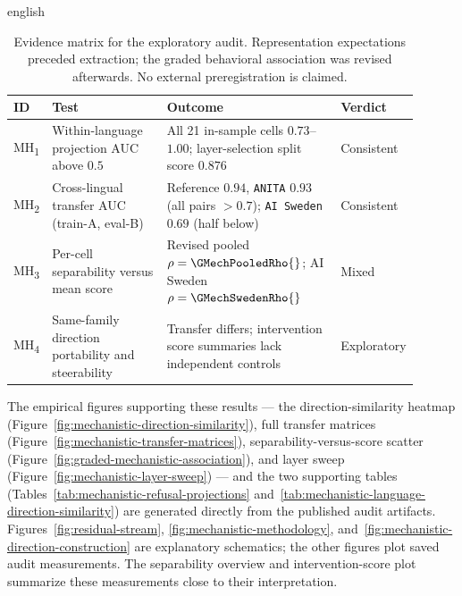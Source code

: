 \begin{otherlanguage*}{english}
\begin{table}[htbp]
\centering
\scriptsize
\caption[Evidence matrix for the refusal-direction audit]{Evidence matrix for the exploratory audit. Representation expectations preceded extraction; the graded behavioral association was revised afterwards. No external preregistration is claimed.}
\label{tab:mechanistic-decision-matrix}
\begin{tabular}{@{}p{0.06\linewidth}p{0.30\linewidth}p{0.44\linewidth}p{0.10\linewidth}@{}}
\toprule
ID & Test & Outcome & Verdict \\
\midrule
MH\textsubscript{1} & Within-language projection AUC above $0.5$ & All 21 in-sample cells $0.73$--$1.00$; layer-selection split score $0.876$ & Consistent \\
MH\textsubscript{2} & Cross-lingual transfer AUC (train-A, eval-B) & Reference $0.94$, \texttt{ANITA} $0.93$ (all pairs $>0.7$); \texttt{AI Sweden} $0.69$ (half below) & Consistent \\
MH\textsubscript{3} & Per-cell separability versus mean score & Revised pooled $\rho=\GMechPooledRho{}$; AI Sweden $\rho=\GMechSwedenRho{}$ & Mixed \\
MH\textsubscript{4} & Same-family direction portability and steerability & Transfer differs; intervention score summaries lack independent controls & Exploratory \\
\bottomrule
\end{tabular}
\end{table}

The empirical figures supporting these results --- the direction-similarity heatmap (Figure~\ref{fig:mechanistic-direction-similarity}), full transfer matrices (Figure~\ref{fig:mechanistic-transfer-matrices}), separability-versus-score scatter (Figure~\ref{fig:graded-mechanistic-association}), and layer sweep (Figure~\ref{fig:mechanistic-layer-sweep}) --- and the two supporting tables (Tables~\ref{tab:mechanistic-refusal-projections} and~\ref{tab:mechanistic-language-direction-similarity}) are generated directly from the published audit artifacts. Figures~\ref{fig:residual-stream}, \ref{fig:mechanistic-methodology}, and~\ref{fig:mechanistic-direction-construction} are explanatory schematics; the other figures plot saved audit measurements. The separability overview and intervention-score plot summarize these measurements close to their interpretation.

\MechTransferAnalysisText


\end{otherlanguage*}
